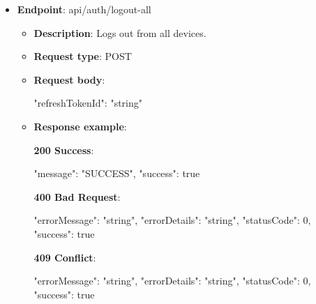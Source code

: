 \begin{itemize}
    \item \textbf{Endpoint}: api/auth/logout-all
    \begin{itemize}
        \item \textbf{Description}: Logs out from all devices.
        \item \textbf{Request type}: POST
        \item \textbf{Request body}:
        \begin{spverbatim}
        {
            "refreshTokenId": "string"
        }
        \end{spverbatim}
        \item  \textbf{Response example}:

        \textbf{200 Success}:

        \begin{spverbatim}
        {
            "message": "SUCCESS",
            "success": true
        }
        \end{spverbatim}

        \textbf{400 Bad Request}:

        \begin{spverbatim}
        {
            "errorMessage": "string",
            "errorDetails": "string",
            "statusCode": 0,
            "success": true
        }
        \end{spverbatim}

        \textbf{409 Conflict}:

        \begin{spverbatim}
        {
            "errorMessage": "string",
            "errorDetails": "string",
            "statusCode": 0,
            "success": true
        }
        \end{spverbatim}
    \end{itemize}

\end{itemize}

